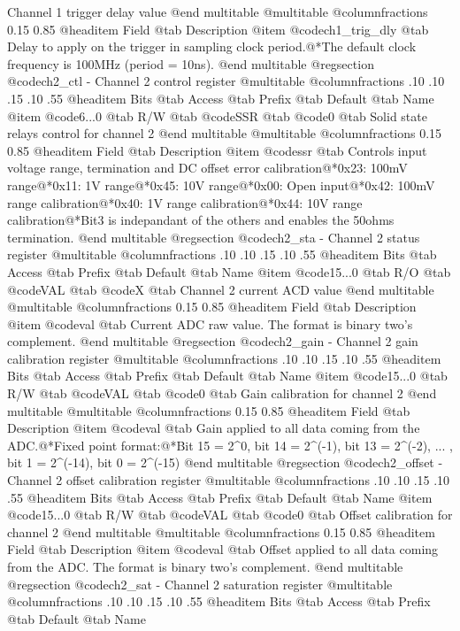 Channel 1 trigger delay value
@end multitable
@multitable @columnfractions 0.15 0.85
@headitem Field @tab Description
@item @code{ch1_trig_dly} @tab Delay to apply on the trigger in sampling clock period.@*The default clock frequency is 100MHz (period = 10ns).
@end multitable
@regsection @code{ch2_ctl} - Channel 2 control register
@multitable @columnfractions .10 .10 .15 .10 .55
@headitem Bits @tab Access @tab Prefix @tab Default @tab Name
@item @code{6...0}
@tab R/W @tab
@code{SSR}
@tab @code{0} @tab 
Solid state relays control for channel 2
@end multitable
@multitable @columnfractions 0.15 0.85
@headitem Field @tab Description
@item @code{ssr} @tab Controls input voltage range, termination and DC offset error calibration@*0x23: 100mV range@*0x11: 1V range@*0x45: 10V range@*0x00: Open input@*0x42: 100mV range calibration@*0x40: 1V range calibration@*0x44: 10V range calibration@*Bit3 is indepandant of the others and enables the 50ohms termination.
@end multitable
@regsection @code{ch2_sta} - Channel 2 status register
@multitable @columnfractions .10 .10 .15 .10 .55
@headitem Bits @tab Access @tab Prefix @tab Default @tab Name
@item @code{15...0}
@tab R/O @tab
@code{VAL}
@tab @code{X} @tab 
Channel 2 current ACD value
@end multitable
@multitable @columnfractions 0.15 0.85
@headitem Field @tab Description
@item @code{val} @tab Current ADC raw value. The format is binary two's complement.
@end multitable
@regsection @code{ch2_gain} - Channel 2 gain calibration register
@multitable @columnfractions .10 .10 .15 .10 .55
@headitem Bits @tab Access @tab Prefix @tab Default @tab Name
@item @code{15...0}
@tab R/W @tab
@code{VAL}
@tab @code{0} @tab 
Gain calibration for channel 2
@end multitable
@multitable @columnfractions 0.15 0.85
@headitem Field @tab Description
@item @code{val} @tab Gain applied to all data coming from the ADC.@*Fixed point format:@*Bit 15 = 2^0, bit 14 = 2^(-1), bit 13 = 2^(-2), ... , bit 1 = 2^(-14), bit 0 = 2^(-15)
@end multitable
@regsection @code{ch2_offset} - Channel 2 offset calibration register
@multitable @columnfractions .10 .10 .15 .10 .55
@headitem Bits @tab Access @tab Prefix @tab Default @tab Name
@item @code{15...0}
@tab R/W @tab
@code{VAL}
@tab @code{0} @tab 
Offset calibration for channel 2
@end multitable
@multitable @columnfractions 0.15 0.85
@headitem Field @tab Description
@item @code{val} @tab Offset applied to all data coming from the ADC. The format is binary two's complement.
@end multitable
@regsection @code{ch2_sat} - Channel 2 saturation register
@multitable @columnfractions .10 .10 .15 .10 .55
@headitem Bits @tab Access @tab Prefix @tab Default @tab Name
